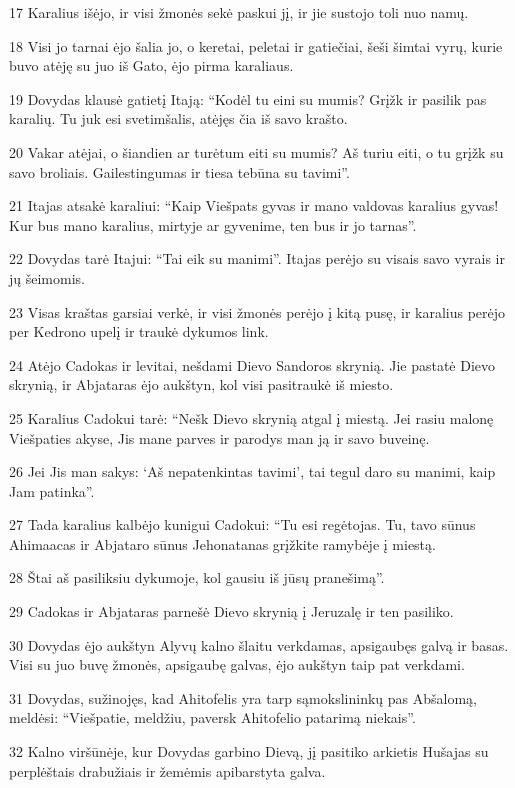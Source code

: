 \par 17 Karalius išėjo, ir visi žmonės sekė paskui jį, ir jie sustojo toli nuo namų. 
\par 18 Visi jo tarnai ėjo šalia jo, o keretai, peletai ir gatiečiai, šeši šimtai vyrų, kurie buvo atėję su juo iš Gato, ėjo pirma karaliaus. 
\par 19 Dovydas klausė gatietį Itają: “Kodėl tu eini su mumis? Grįžk ir pasilik pas karalių. Tu juk esi svetimšalis, atėjęs čia iš savo krašto. 
\par 20 Vakar atėjai, o šiandien ar turėtum eiti su mumis? Aš turiu eiti, o tu grįžk su savo broliais. Gailestingumas ir tiesa tebūna su tavimi”. 
\par 21 Itajas atsakė karaliui: “Kaip Viešpats gyvas ir mano valdovas karalius gyvas! Kur bus mano karalius, mirtyje ar gyvenime, ten bus ir jo tarnas”. 
\par 22 Dovydas tarė Itajui: “Tai eik su manimi”. Itajas perėjo su visais savo vyrais ir jų šeimomis. 
\par 23 Visas kraštas garsiai verkė, ir visi žmonės perėjo į kitą pusę, ir karalius perėjo per Kedrono upelį ir traukė dykumos link. 
\par 24 Atėjo Cadokas ir levitai, nešdami Dievo Sandoros skrynią. Jie pastatė Dievo skrynią, ir Abjataras ėjo aukštyn, kol visi pasitraukė iš miesto. 
\par 25 Karalius Cadokui tarė: “Nešk Dievo skrynią atgal į miestą. Jei rasiu malonę Viešpaties akyse, Jis mane parves ir parodys man ją ir savo buveinę. 
\par 26 Jei Jis man sakys: ‘Aš nepatenkintas tavimi’, tai tegul daro su manimi, kaip Jam patinka”. 
\par 27 Tada karalius kalbėjo kunigui Cadokui: “Tu esi regėtojas. Tu, tavo sūnus Ahimaacas ir Abjataro sūnus Jehonatanas grįžkite ramybėje į miestą. 
\par 28 Štai aš pasiliksiu dykumoje, kol gausiu iš jūsų pranešimą”. 
\par 29 Cadokas ir Abjataras parnešė Dievo skrynią į Jeruzalę ir ten pasiliko. 
\par 30 Dovydas ėjo aukštyn Alyvų kalno šlaitu verkdamas, apsigaubęs galvą ir basas. Visi su juo buvę žmonės, apsigaubę galvas, ėjo aukštyn taip pat verkdami. 
\par 31 Dovydas, sužinojęs, kad Ahitofelis yra tarp sąmokslininkų pas Abšalomą, meldėsi: “Viešpatie, meldžiu, paversk Ahitofelio patarimą niekais”. 
\par 32 Kalno viršūnėje, kur Dovydas garbino Dievą, jį pasitiko arkietis Hušajas su perplėštais drabužiais ir žemėmis apibarstyta galva. 
